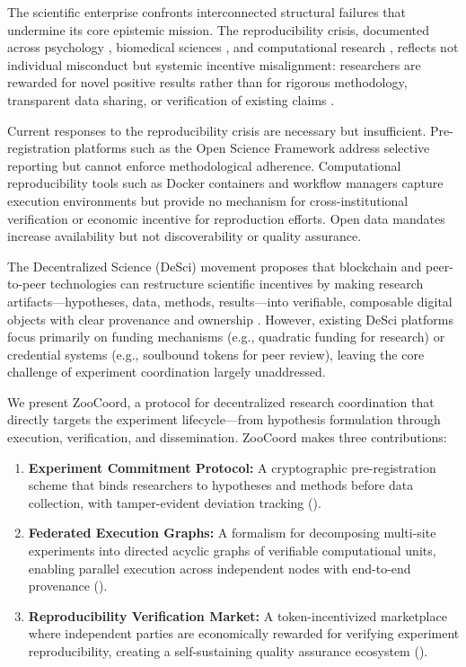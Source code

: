\documentclass[11pt,a4paper]{article}
\begin{document}
The scientific enterprise confronts interconnected structural failures that undermine its core epistemic mission.
The reproducibility crisis, documented across psychology \citep{openscience2015estimating}, biomedical sciences \citep{begley2012drug}, and computational research \citep{hutson2018artificial}, reflects not individual misconduct but systemic incentive misalignment: researchers are rewarded for novel positive results rather than for rigorous methodology, transparent data sharing, or verification of existing claims \citep{smaldino2016natural}.

Current responses to the reproducibility crisis are necessary but insufficient.
Pre-registration platforms such as the Open Science Framework \citep{nosek2018preregistration} address selective reporting but cannot enforce methodological adherence.
Computational reproducibility tools such as Docker containers and workflow managers \citep{gruning2018practical} capture execution environments but provide no mechanism for cross-institutional verification or economic incentive for reproduction efforts.
Open data mandates \citep{wilkinson2016fair} increase availability but not discoverability or quality assurance.

The Decentralized Science (DeSci) movement proposes that blockchain and peer-to-peer technologies can restructure scientific incentives by making research artifacts---hypotheses, data, methods, results---into verifiable, composable digital objects with clear provenance and ownership \citep{hamburg2019desci}.
However, existing DeSci platforms focus primarily on funding mechanisms (e.g., quadratic funding for research) or credential systems (e.g., soulbound tokens for peer review), leaving the core challenge of experiment coordination largely unaddressed.

We present ZooCoord, a protocol for decentralized research coordination that directly targets the experiment lifecycle---from hypothesis formulation through execution, verification, and dissemination.
ZooCoord makes three contributions:

\begin{enumerate}[leftmargin=*]
    \item \textbf{Experiment Commitment Protocol:} A cryptographic pre-registration scheme that binds researchers to hypotheses and methods before data collection, with tamper-evident deviation tracking ().
    \item \textbf{Federated Execution Graphs:} A formalism for decomposing multi-site experiments into directed acyclic graphs of verifiable computational units, enabling parallel execution across independent nodes with end-to-end provenance ().
    \item \textbf{Reproducibility Verification Market:} A token-incentivized marketplace where independent parties are economically rewarded for verifying experiment reproducibility, creating a self-sustaining quality assurance ecosystem ().
\end{enumerate}
\end{document}
